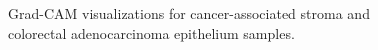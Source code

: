 \begin{figure}[htbp]
    \centering
    
    \caption{Grad-CAM visualizations for cancer-associated stroma and colorectal
    adenocarcinoma epithelium samples.}
    \label{fig:baseline224-gradcam}
\end{figure}
